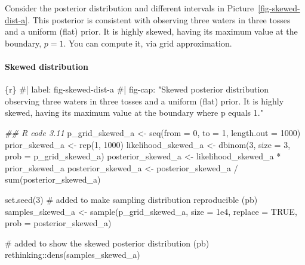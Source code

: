 \documentclass[
  letterpaper,
  DIV=11,
  numbers=noendperiod]{scrreprt}
\let\oldparagraph\paragraph
\renewcommand{\paragraph}[1]{\oldparagraph{#1}\mbox{}}
\newenvironment{Shaded}{\begin{snugshade}}{\end{snugshade}}
\newcommand{\AttributeTok}[1]{\textcolor[rgb]{0.40,0.45,0.13}{#1}}
\newcommand{\CommentTok}[1]{\textcolor[rgb]{0.37,0.37,0.37}{#1}}
\newcommand{\ConstantTok}[1]{\textcolor[rgb]{0.56,0.35,0.01}{#1}}
\newcommand{\DecValTok}[1]{\textcolor[rgb]{0.68,0.00,0.00}{#1}}
\newcommand{\DocumentationTok}[1]{\textcolor[rgb]{0.37,0.37,0.37}{\textit{#1}}}
\newcommand{\FloatTok}[1]{\textcolor[rgb]{0.68,0.00,0.00}{#1}}
\newcommand{\FunctionTok}[1]{\textcolor[rgb]{0.28,0.35,0.67}{#1}}
\newcommand{\InformationTok}[1]{\textcolor[rgb]{0.37,0.37,0.37}{#1}}
\newcommand{\NormalTok}[1]{\textcolor[rgb]{0.00,0.23,0.31}{#1}}
\newcommand{\OtherTok}[1]{\textcolor[rgb]{0.00,0.23,0.31}{#1}}
\newcommand{\SpecialCharTok}[1]{\textcolor[rgb]{0.37,0.37,0.37}{#1}}
\begin{document}
Consider the posterior distribution and different intervals in
Picture~\ref{fig-skewed-dist-a}. This posterior is consistent with
observing three waters in three tosses and a uniform (flat) prior. It is
highly skewed, having its maximum value at the boundary, \(p = 1\). You
can compute it, via grid approximation.

\hypertarget{skewed-distribution}{%
\paragraph{Skewed distribution}\label{skewed-distribution}}

\begin{Shaded}
\begin{Highlighting}[]
\InformationTok{\textasciigrave{}\textasciigrave{}\textasciigrave{}\{r\}}
\CommentTok{\#| label: fig{-}skewed{-}dist{-}a}
\CommentTok{\#| fig{-}cap: "Skewed posterior distribution observing three waters in three tosses and a uniform (flat) prior. It is highly skewed, having its maximum value at the boundary where p equals 1."}

\DocumentationTok{\#\# R code 3.11}
\NormalTok{p\_grid\_skewed\_a }\OtherTok{\textless{}{-}} \FunctionTok{seq}\NormalTok{(}\AttributeTok{from =} \DecValTok{0}\NormalTok{, }\AttributeTok{to =} \DecValTok{1}\NormalTok{, }\AttributeTok{length.out =} \DecValTok{1000}\NormalTok{)}
\NormalTok{prior\_skewed\_a }\OtherTok{\textless{}{-}} \FunctionTok{rep}\NormalTok{(}\DecValTok{1}\NormalTok{, }\DecValTok{1000}\NormalTok{)}
\NormalTok{likelihood\_skewed\_a }\OtherTok{\textless{}{-}} \FunctionTok{dbinom}\NormalTok{(}\DecValTok{3}\NormalTok{, }\AttributeTok{size =} \DecValTok{3}\NormalTok{, }\AttributeTok{prob =}\NormalTok{ p\_grid\_skewed\_a)}
\NormalTok{posterior\_skewed\_a }\OtherTok{\textless{}{-}}\NormalTok{ likelihood\_skewed\_a }\SpecialCharTok{*}\NormalTok{ prior\_skewed\_a}
\NormalTok{posterior\_skewed\_a }\OtherTok{\textless{}{-}}\NormalTok{ posterior\_skewed\_a }\SpecialCharTok{/} \FunctionTok{sum}\NormalTok{(posterior\_skewed\_a)}

\FunctionTok{set.seed}\NormalTok{(}\DecValTok{3}\NormalTok{) }\CommentTok{\# added to make sampling distribution reproducible (pb)}
\NormalTok{samples\_skewed\_a }\OtherTok{\textless{}{-}} \FunctionTok{sample}\NormalTok{(p\_grid\_skewed\_a, }\AttributeTok{size =} \FloatTok{1e4}\NormalTok{, }\AttributeTok{replace =} \ConstantTok{TRUE}\NormalTok{, }\AttributeTok{prob =}\NormalTok{ posterior\_skewed\_a)}



\CommentTok{\# added to show the skewed posterior distribution (pb)}
\NormalTok{rethinking}\SpecialCharTok{::}\FunctionTok{dens}\NormalTok{(samples\_skewed\_a)}
\InformationTok{\textasciigrave{}\textasciigrave{}\textasciigrave{}}
\end{Highlighting}
\end{Shaded}
\end{document}
